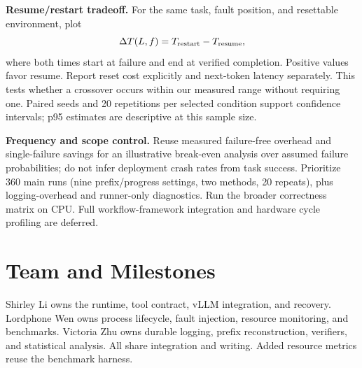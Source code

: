 \documentclass{article}
\begin{document}
\textbf{Resume/restart tradeoff.} For the same task, fault position, and resettable environment, plot
\[
\Delta T(L,f)=T_{\rm restart}-T_{\rm resume},
\]
where both times start at failure and end at verified completion. Positive values favor resume. Report reset cost explicitly and next-token latency separately. This tests whether a crossover occurs within our measured range without requiring one. Paired seeds and 20 repetitions per selected condition support confidence intervals; p95 estimates are descriptive at this sample size.

\begin{samepage}
\textbf{Frequency and scope control.} Reuse measured failure-free overhead and single-failure savings for an illustrative break-even analysis over assumed failure probabilities; do not infer deployment crash rates from task success. Prioritize 360 main runs (nine prefix/progress settings, two methods, 20 repeats), plus logging-overhead and runner-only diagnostics. Run the broader correctness matrix on CPU. Full workflow-framework integration and hardware cycle profiling are deferred.
\par
\end{samepage}

\section{Team and Milestones}
Shirley Li owns the runtime, tool contract, vLLM integration, and recovery. Lordphone Wen owns process lifecycle, fault injection, resource monitoring, and benchmarks. Victoria Zhu owns durable logging, prefix reconstruction, verifiers, and statistical analysis. All share integration and writing. Added resource metrics reuse the benchmark harness.

\end{document}

